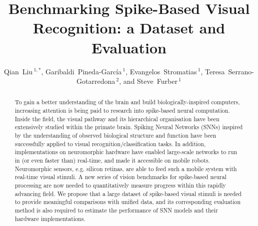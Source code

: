 \documentclass{frontiersENG} %
\def\firstAuthorLast{Qian Liu {et~al.}} %
\def\Authors{Qian~Liu\,$^{1,*}$, Garibaldi~Pineda-Garc\'ia\,$^{1}$, Evangelos~Stromatias\,$^{1}$, Teresa~Serrano-Gotarredona\,$^{2}$, and Steve~Furber\,$^{1}$}
\begin{document}
\onecolumn
{}

\title[Benchmarking Spike-Based Visual Recognition: a Dataset and Evaluation]{Benchmarking  Spike-Based Visual Recognition: a Dataset and Evaluation}
\author[\firstAuthorLast ]{\Authors}
\address{}
\correspondance{}
\extraAuth{}%
\topic{}

\maketitle
\begin{abstract}

To gain a better understanding of the brain and build biologically-inspired computers, increasing attention is being paid to research into spike-based neural computation.
Inside the field, the visual pathway and its hierarchical organisation have been extensively studied within the primate brain.
Spiking Neural Networks (SNNs) inspired by the understanding of observed biological structure and function have been successfully applied to visual recognition/classification tasks.
In addition, implementations on neuromorphic hardware have enabled large-scale networks to run in (or even faster than) real-time, and made it accessible on mobile robots.
Neuromorphic sensors, e.g. silicon retinas, are able to feed such a mobile system with real-time visual stimuli.
A new series of vision benchmarks for spike-based neural processing are now needed to quantitatively measure progress within this rapidly advancing field.
We propose that a large dataset of spike-based visual stimuli is needed to provide meaningful comparisons with unified data, and its corresponding evaluation method is also required to estimate the performance of SNN models and their hardware implementations.


\end{abstract}
\end{document}
